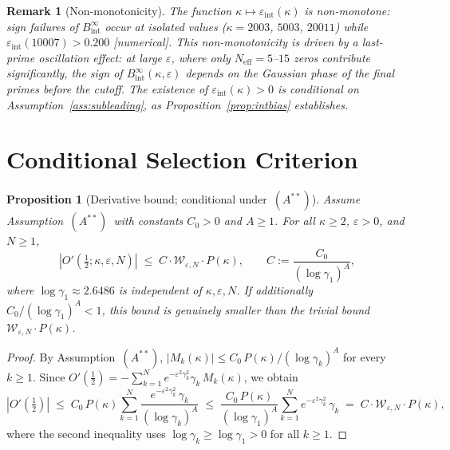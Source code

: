 \documentclass[11pt]{article}
\newtheorem{proposition}[theorem]{Proposition}
\newtheorem*{remark}{Remark}
\newcommand{\Wgamma}{\mathcal{W}_{\varepsilon,N}}   %
\newcommand{\Astar}{\ensuremath{(A^{**})}}  %
\begin{document}
\begin{remark}[Non-monotonicity]
The function $\kappa\mapsto\varepsilon_{\mathrm{int}}(\kappa)$ is non-monotone:
sign failures of $B_{\mathrm{int}}^\infty$ occur at isolated values
($\kappa=2003$, $5003$, $20011$) while $\varepsilon_{\mathrm{int}}(10007)>0.200$
[numerical].
This non-monotonicity is driven by a last-prime oscillation effect:
at large $\varepsilon$, where only $N_{\mathrm{eff}}=5$--$15$ zeros
contribute significantly, the sign of $B_{\mathrm{int}}^\infty(\kappa,\varepsilon)$
depends on the Gaussian phase of the final primes before the cutoff.
The existence of $\varepsilon_{\mathrm{int}}(\kappa)>0$ is conditional on
Assumption~\ref{ass:subleading},
as Proposition~\ref{prop:intbias} establishes.
\end{remark}

\section{Conditional Selection Criterion}
\label{sec:sel}

\begin{proposition}[Derivative bound; conditional under~\Astar]
\label{prop:deriv}
Assume Assumption~\Astar\ with constants $C_0>0$ and $A\ge 1$.
For all $\kappa\ge 2$, $\varepsilon>0$, and $N\ge 1$,
\[
\left|O'\!\left(\tfrac12;\kappa,\varepsilon,N\right)\right|
\;\le\; C\cdot\Wgamma\cdot P(\kappa),
\qquad C:=\frac{C_0}{(\log\gamma_1)^A},
\]
where $\log\gamma_1\approx 2.6486$ is independent of
$\kappa,\varepsilon,N$.
If additionally $C_0/(\log\gamma_1)^A<1$, this bound is
genuinely smaller than the trivial bound $\Wgamma\cdot P(\kappa)$.
\end{proposition}

\begin{proof}
By Assumption~\Astar, $|M_k(\kappa)|\le C_0\,P(\kappa)/(\log\gamma_k)^A$
for every $k\ge 1$.
Since $O'(\tfrac12)=-\sum_{k=1}^N e^{-\varepsilon^2\gamma_k^2}\gamma_k\,M_k(\kappa)$,
we obtain
\[
|O'(\tfrac12)|
  \;\le\; C_0\,P(\kappa)\sum_{k=1}^N
         \frac{e^{-\varepsilon^2\gamma_k^2}\,\gamma_k}{(\log\gamma_k)^A}
  \;\le\; \frac{C_0\,P(\kappa)}{(\log\gamma_1)^A}
         \sum_{k=1}^N e^{-\varepsilon^2\gamma_k^2}\,\gamma_k
  \;=\; C\cdot\Wgamma\cdot P(\kappa),
\]
where the second inequality uses $\log\gamma_k\ge\log\gamma_1>0$
for all $k\ge 1$.
\end{proof}
\end{document}
